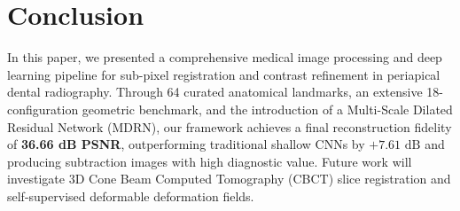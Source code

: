 \documentclass[11pt,a4paper]{article}
\begin{document}
\section{Conclusion}
\label{sec:conclusion}

In this paper, we presented a comprehensive medical image processing and deep learning pipeline for sub-pixel registration and contrast refinement in periapical dental radiography. Through 64 curated anatomical landmarks, an extensive 18-configuration geometric benchmark, and the introduction of a Multi-Scale Dilated Residual Network (MDRN), our framework achieves a final reconstruction fidelity of \textbf{36.66 dB PSNR}, outperforming traditional shallow CNNs by $+7.61\text{ dB}$ and producing subtraction images with high diagnostic value. Future work will investigate 3D Cone Beam Computed Tomography (CBCT) slice registration and self-supervised deformable deformation fields.



\end{document}
